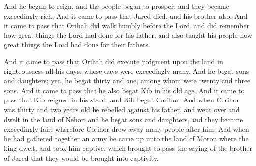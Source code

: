 And he began to reign, and the people began to prosper; and they became exceedingly rich.
\bverse \iffalse And it came to pass that Jared died, and his brother also. \fi
And it came to pass that Jared died, and his brother also.
\bverse \iffalse And it came to pass that Orihah did walk humbly before the Lord, and did remember how great things the Lord had done for his father, and also taught his people how great things the Lord had done for their fathers. \fi
And it came to pass that Orihah did walk humbly before the Lord, and did remember how great things the Lord had done for his father, and also taught his people how great things the Lord had done for their fathers.

\bchapter
\bverse \iffalse And it came to pass that Orihah did execute judgment upon the land in righteousness all his days, whose days were exceedingly many. \fi
And it came to pass that Orihah did execute judgment upon the land in righteousness all his days, whose days were exceedingly many.
\bverse \iffalse And he begat sons and daughters; yea, he begat thirty and one, among whom were twenty and three sons. \fi
And he begat sons and daughters; yea, he begat thirty and one, among whom were twenty and three sons.
\bverse \iffalse And it came to pass that he also begat Kib in his old age.  And it came to pass that Kib reigned in his stead; and Kib begat Corihor. \fi
And it came to pass that he also begat Kib in his old age.  And it came to pass that Kib reigned in his stead; and Kib begat Corihor.
\bverse \iffalse And when Corihor was thirty and two years old he rebelled against his father, and went over and dwelt in the land of Nehor; and he begat sons and daughters, and they became exceedingly fair; wherefore Corihor drew away many people after him. \fi
And when Corihor was thirty and two years old he rebelled against his father, and went over and dwelt in the land of Nehor; and he begat sons and daughters, and they became exceedingly fair; wherefore Corihor drew away many people after him.
\bverse \iffalse And when he had gathered together an army he came up unto the land of Moron where the king dwelt, and took him captive, which brought to pass the saying of the brother of Jared that they would be brought into captivity. \fi
And when he had gathered together an army he came up unto the land of Moron where the king dwelt, and took him captive, which brought to pass the saying of the brother of Jared that they would be brought into captivity.
\bverse \iffalse Now the land of Moron, where the king dwelt, was near the land which is called Desolation by the Nephites. \fi
